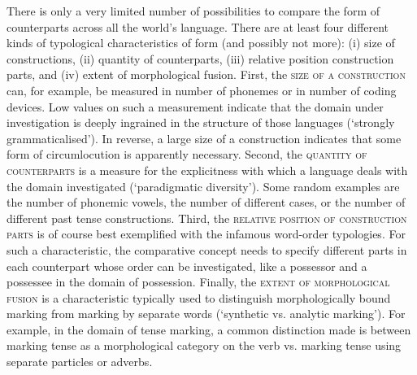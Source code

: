 %
There is only a very limited number of possibilities to compare the form of counterparts across all the world's language. There are at least four different kinds of typological characteristics of form (and possibly not more): (i) size of constructions, (ii) quantity of counterparts, (iii) relative position construction parts, and (iv) extent of morphological fusion. First, the \textsc{size of a construction} can, for example, be measured in number of phonemes or in number of coding devices. Low values on such a measurement indicate that the domain under investigation is deeply ingrained in the structure of those languages (`strongly grammaticalised'). In reverse, a large size of a construction indicates that some form of circumlocution is apparently necessary. Second, the \textsc{quantity of counterparts} is a measure for the explicitness with which a language deals with the domain investigated (`paradigmatic diversity'). Some random examples are the number of phonemic vowels, the number of different cases, or the number of different past tense constructions. Third, the \textsc{relative position of construction parts} is of course best exemplified with the infamous word-order typologies. For such a characteristic, the comparative concept needs to specify different parts in each counterpart whose order can be investigated, like a possessor and a possessee in the domain of possession. Finally, the \textsc{extent of morphological fusion} is a characteristic typically used to distinguish morphologically bound marking from marking by separate words (`synthetic vs. analytic marking'). For example, in the domain of tense marking, a common distinction made is between marking tense as a morphological category on the verb vs. marking tense using separate particles or adverbs.

